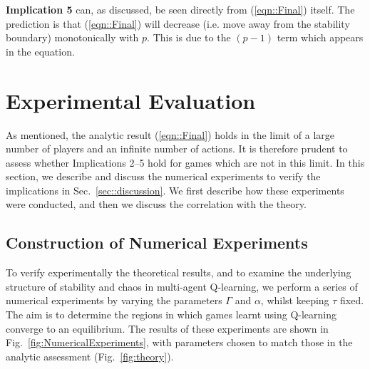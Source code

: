\documentclass{article}
\begin{document}


\textbf{Implication 5} can, as discussed, be seen directly from (\ref{eqn::Final}) itself. The prediction is that (\ref{eqn::Final}) will decrease (i.e. move away from the stability boundary) monotonically with $p$. This is due to the $(p - 1)$ term which appears in the equation.




\section{Experimental Evaluation} \label{sec::exev}

As mentioned, the analytic result (\ref{eqn::Final}) holds in the limit of a large number of players and an infinite number of actions. It is therefore prudent to assess whether Implications 2--5 hold for games which are not in this limit. In this section, we describe and discuss the numerical experiments to verify the implications in Sec.~\ref{sec::discussion}. We first describe how these experiments were conducted, and then
we discuss the correlation with the theory.

\subsection{Construction of Numerical Experiments}

To verify experimentally the theoretical results, and to examine the underlying structure of stability and chaos in
multi-agent Q-learning, we perform a series of numerical experiments by varying the parameters $\Gamma$ and
$\alpha$, whilst keeping $\tau$ fixed. The aim is to determine the regions in which games learnt using Q-learning converge to an equilibrium. The results of these experiments are shown in Fig.~\ref{fig:NumericalExperiments}, with parameters chosen to match those in the analytic assessment (Fig.~\ref{fig:theory}).
\end{document}

